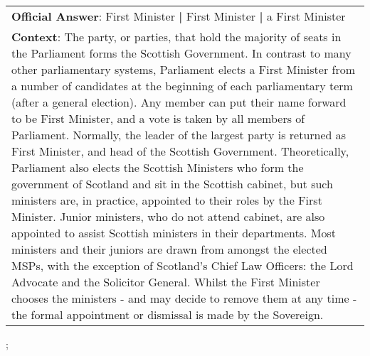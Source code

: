 \begin{figure*}[ht]
{\begin{tabular}{p{}}
            \textbf{Official Answer}: First Minister \textbf{|} First Minister \textbf{|} a First Minister                                                                                                                                                                                                                                                                                                                                                                                                                                                                                                                                                                                                                                                                                                                                                                                                                                                                                                                                                                                                                                                                                                                                  \\
            \textbf{Context}: The party, or parties, that hold the majority of seats in the Parliament forms the Scottish Government. In contrast to many other parliamentary systems, Parliament elects a First Minister from a number of candidates at the beginning of each parliamentary term (after a general election). Any member can put their name forward to be First Minister, and a vote is taken by all members of Parliament. Normally, the leader of the largest party is returned as First Minister, and head of the Scottish Government. Theoretically, Parliament also elects the Scottish Ministers who form the government of Scotland and sit in the Scottish cabinet, but such ministers are, in practice, appointed to their roles by the First Minister. Junior ministers, who do not attend cabinet, are also appointed to assist Scottish ministers in their departments. Most ministers and their juniors are drawn from amongst the elected MSPs, with the exception of Scotland's Chief Law Officers: the Lord Advocate and the Solicitor General. Whilst the First Minister chooses the ministers - and may decide to remove them at any time - the formal appointment or dismissal is made by the Sovereign. \\
        \end{tabular}
    };
    \label{fig:ex-572fd47fa23a5019007fca56}
\end{figure*}

